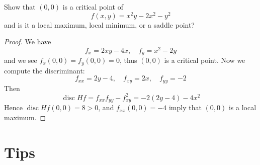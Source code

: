 \documentclass[openany]{book}
\DeclareMathOperator{\disc}{disc}
\begin{document}
\begin{prob}
    Show that $(0,0)$ is a critical point of
    \begin{equation*}
        f(x,y)=x^2y-2x^2-y^2
    \end{equation*}
    and is it a local maximum, local minimum, or a saddle point?
\end{prob}
\begin{proof}
    We have 
    \begin{equation*}
        f_x=2xy-4x, \quad f_y=x^2-2y
    \end{equation*}
    and we see $f_x(0,0)=f_y(0,0)=0$, thus $(0,0)$ is a critical point. Now we compute the discriminant:
    \begin{equation*}
        f_{xx}=2y-4, \quad f_{xy}=2x, \quad f_{yy}=-2
    \end{equation*}
    Then 
    \begin{equation*}
        \disc Hf=f_{xx}f_{yy}-f_{xy}^2=-2(2y-4)-4x^2
    \end{equation*}
    Hence $\disc Hf(0,0)=8>0$, and $f_{xx}(0,0)=-4$ imply that $(0,0)$ is a local maximum.
\end{proof}




\chapter{Tips}
\end{document}
